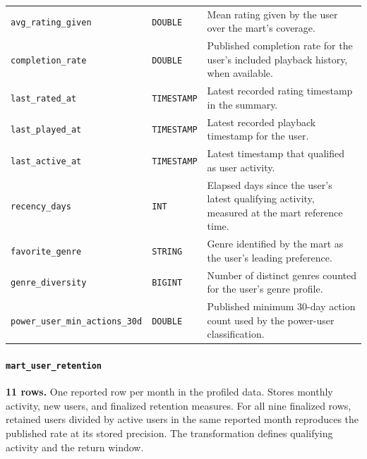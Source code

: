 \documentclass[a4paper,12pt]{article}
\newcommand{\dbsep}{\_\allowbreak}
\begin{document}
\begin{longtable}{@{}>{\raggedright\arraybackslash}p{}
                    >{\raggedright\arraybackslash}p{}
                    >{\raggedright\arraybackslash}p{}@{}}
\texttt{avg\dbsep rating\dbsep given} & \texttt{DOUBLE} & Mean rating given by the user over the mart's coverage.\\
\texttt{completion\dbsep rate} & \texttt{DOUBLE} & Published completion rate for the user's included playback history, when available.\\
\texttt{last\dbsep rated\dbsep at} & \texttt{TIMESTAMP} & Latest recorded rating timestamp in the summary.\\
\texttt{last\dbsep played\dbsep at} & \texttt{TIMESTAMP} & Latest recorded playback timestamp for the user.\\
\texttt{last\dbsep active\dbsep at} & \texttt{TIMESTAMP} & Latest timestamp that qualified as user activity.\\
\texttt{recency\dbsep days} & \texttt{INT} & Elapsed days since the user's latest qualifying activity, measured at the mart reference time.\\
\texttt{favorite\dbsep genre} & \texttt{STRING} & Genre identified by the mart as the user's leading preference.\\
\texttt{genre\dbsep diversity} & \texttt{BIGINT} & Number of distinct genres counted for the user's genre profile.\\
\texttt{power\dbsep user\dbsep min\dbsep actions\dbsep 30d} & \texttt{DOUBLE} & Published minimum 30-day action count used by the power-user classification.\\
\end{longtable}
\endgroup

\paragraph{\texttt{mart\dbsep user\dbsep retention}}
\textbf{11 rows.} One reported row per month in the profiled data.
Stores monthly activity, new users, and finalized retention measures. For all nine finalized rows, retained users divided by active users in the same reported month reproduces the published rate at its stored precision. The transformation defines qualifying activity and the return window.
\end{document}
